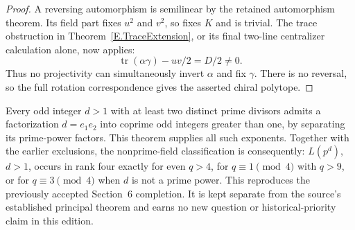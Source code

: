 \begin{proof}
A reversing automorphism is semilinear by the retained automorphism
theorem. Its field part fixes $u^2$ and $v^2$, so fixes $K$ and is
trivial. The trace obstruction in Theorem~\ref{E.TraceExtension}, or
its final two-line centralizer calculation alone, now applies:
\[
 \operatorname{tr}(\alpha\gamma)-uv/2=D/2\ne0.
\]
Thus no projectivity can simultaneously invert $\alpha$ and fix
$\gamma$. There is no reversal, so the full rotation correspondence
gives the asserted chiral polytope.
\end{proof}

Every odd integer $d>1$ with at least two distinct prime divisors admits
a factorization $d=e_1e_2$ into coprime odd integers greater than one,
by separating its prime-power factors. This theorem supplies all such
exponents. Together with the earlier exclusions, the nonprime-field
classification is consequently: $L(p^d)$, $d>1$, occurs in rank four
exactly for even $q>4$, for $q\equiv1\pmod4$ with $q>9$, or for
$q\equiv3\pmod4$ when $d$ is not a prime power. This reproduces the
previously accepted Section~6 completion. It is kept separate from
the source's established principal theorem and earns no new question
or historical-priority claim in this edition.
